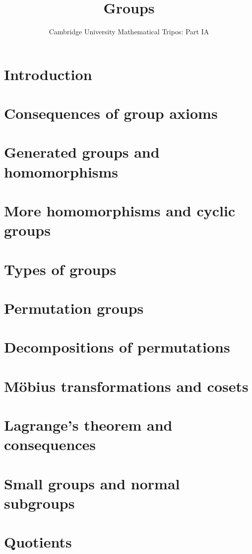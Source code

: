 \documentclass{article}
\title{Groups}
\author{Cambridge University Mathematical Tripos: Part IA}
\begin{document}
\maketitle

\tableofcontentsnewpage{}

\section{Introduction}

\section{Consequences of group axioms}

\section{Generated groups and homomorphisms}

\section{More homomorphisms and cyclic groups}

\section{Types of groups}

\section{Permutation groups}

\section{Decompositions of permutations}

\section{M\"obius transformations and cosets}

\section{Lagrange's theorem and consequences}

\section{Small groups and normal subgroups}

\section{Quotients}

\end{document}
